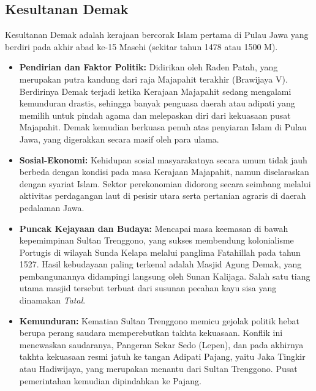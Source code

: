 \documentclass[12pt, a4paper]{article}
\begin{document}
\subsection{Kesultanan Demak}
Kesultanan Demak adalah kerajaan bercorak Islam pertama di Pulau Jawa yang berdiri pada akhir abad ke-15 Masehi (sekitar tahun 1478 atau 1500 M).
\begin{itemize}
	\item \textbf{Pendirian dan Faktor Politik:} Didirikan oleh Raden Patah, yang merupakan putra kandung dari raja Majapahit terakhir (Brawijaya V). Berdirinya Demak terjadi ketika Kerajaan Majapahit sedang mengalami kemunduran drastis, sehingga banyak penguasa daerah atau adipati yang memilih untuk pindah agama dan melepaskan diri dari kekuasaan pusat Majapahit. Demak kemudian berkuasa penuh atas penyiaran Islam di Pulau Jawa, yang digerakkan secara masif oleh para ulama.
	\item \textbf{Sosial-Ekonomi:} Kehidupan sosial masyarakatnya secara umum tidak jauh berbeda dengan kondisi pada masa Kerajaan Majapahit, namun diselaraskan dengan syariat Islam. Sektor perekonomian didorong secara seimbang melalui aktivitas perdagangan laut di pesisir utara serta pertanian agraris di daerah pedalaman Jawa.
	\item \textbf{Puncak Kejayaan dan Budaya:} Mencapai masa keemasan di bawah kepemimpinan Sultan Trenggono, yang sukses membendung kolonialisme Portugis di wilayah Sunda Kelapa melalui panglima Fatahillah pada tahun 1527. Hasil kebudayaan paling terkenal adalah Masjid Agung Demak, yang pembangunannya didampingi langsung oleh Sunan Kalijaga. Salah satu tiang utama masjid tersebut terbuat dari susunan pecahan kayu sisa yang dinamakan \textit{Tatal}.
	\item \textbf{Kemunduran:} Kematian Sultan Trenggono memicu gejolak politik hebat berupa perang saudara memperebutkan takhta kekuasaan. Konflik ini menewaskan saudaranya, Pangeran Sekar Sedo (Lepen), dan pada akhirnya takhta kekuasaan resmi jatuh ke tangan Adipati Pajang, yaitu Jaka Tingkir atau Hadiwijaya, yang merupakan menantu dari Sultan Trenggono. Pusat pemerintahan kemudian dipindahkan ke Pajang.
\end{itemize}
\end{document}
